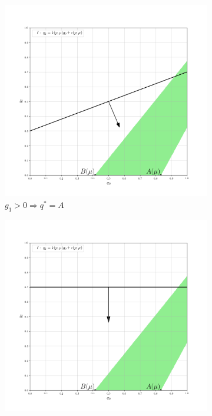 \begin{flushleft}
	\begin{figure}[H]
    	\centering
     	\begin{subfigure}[b]{0.3 \textwidth}
        	\centering
        	\includegraphics[width=\textwidth]{images/graf_3_9_0}
        	\caption{$g_1 > 0 \Rightarrow q^*=A$}
         	\label{fig:y equals x}
     	\end{subfigure}
     	\begin{subfigure}[b]{0.3 \textwidth}
        	\centering
        	\includegraphics[width=\textwidth]{images/graf_3_9_2}

\end{subfigure}
\end{figure}
\end{flushleft}
